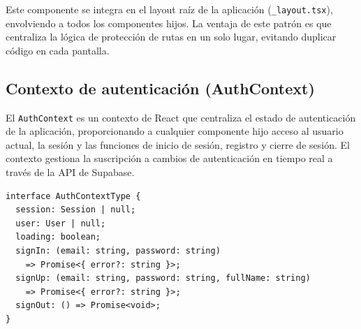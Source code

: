 Este componente se integra en el layout ra\'iz de la aplicaci\'on
(\texttt{\_layout.tsx}), envolviendo a todos los componentes hijos. La
ventaja de este patr\'on es que centraliza la l\'ogica de protecci\'on de rutas
en un solo lugar, evitando duplicar c\'odigo en cada pantalla.

\begin{figure}[H]
\centering
\end{figure}

\subsection{Contexto de autenticaci\'on (AuthContext)}

El \texttt{AuthContext} es un contexto de React que centraliza el estado de
autenticaci\'on de la aplicaci\'on, proporcionando a cualquier componente hijo
acceso al usuario actual, la sesi\'on y las funciones de inicio de sesi\'on,
registro y cierre de sesi\'on. El contexto gestiona la suscripci\'on a cambios
de autenticaci\'on en tiempo real a trav\'es de la API de Supabase.

\begin{lstlisting}
interface AuthContextType {
  session: Session | null;
  user: User | null;
  loading: boolean;
  signIn: (email: string, password: string)
    => Promise<{ error?: string }>;
  signUp: (email: string, password: string, fullName: string)
    => Promise<{ error?: string }>;
  signOut: () => Promise<void>;
}
\end{lstlisting}

